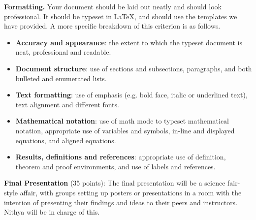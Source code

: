 \documentclass{article}
\begin{document}
\begin{itemize}
\begin{itemize}
        \textbf{Formatting.} Your document should be laid out neatly and should look professional. It should be typeset in \LaTeX, and should use the templates we have provided. A more specific breakdown of this criterion is as follows.
        \begin{itemize}
            \item \textbf{Accuracy and appearance}: the extent to which the typeset document is neat, professional and readable.
            \item \textbf{Document structure}: use of sections and subsections, paragraphs, and both bulleted and enumerated lists.
            \item \textbf{Text formatting}: use of emphasis (e.g. bold face, italic or underlined text), text alignment and different fonts.
            \item \textbf{Mathematical notation}: use of math mode to typeset mathematical notation, appropriate use of variables and symbols, in-line and displayed equations, and aligned equations.
            \item \textbf{Results, definitions and references}: appropriate use of definition, theorem and proof environments, and use of labels and references.
        \end{itemize}
    \end{itemize}
    \textbf{Final Presentation} (35 points): The final presentation will be a science fair-style affair, with groups setting up posters or presentations in a room with the intention of presenting their findings and ideas to their peers and instructors. Nithya will be in charge of this.
\end{itemize}
\end{document}
